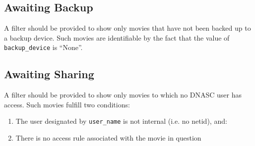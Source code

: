 \subsection{Awaiting Backup}

A filter should be provided to show only movies that have not been backed up to a backup device.
Such movies are identifiable by the fact that the value of \texttt{backup\_device} is ``None''. 

\subsection{Awaiting Sharing}

A filter should be provided to show only movies to which no DNASC user has access. Such movies 
fulfill two conditions:
\begin{enumerate}\itemsep1pt
    \item The user designated by \texttt{user\_name} is not internal (i.e. no netid), and:
    \item There is no access rule associated with the movie in question
\end{enumerate}
